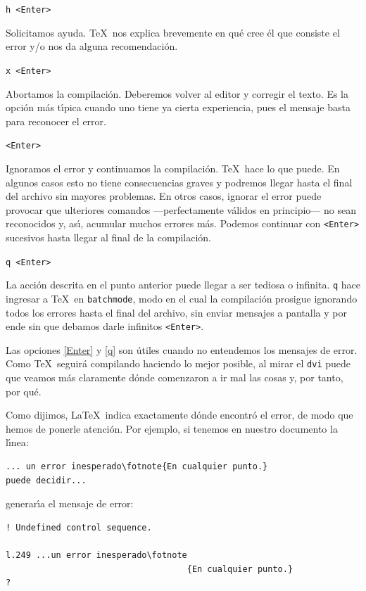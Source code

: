 \begin{list}{()}{%
\renewcommand{\theenumi}{(\alph{enumi})}}
\item \verb+h <Enter>+

Solicitamos ayuda. \TeX\ nos explica brevemente en qu{\'e} cree {\'e}l
que consiste el error y/o nos da alguna recomendaci{\'o}n.

\item \verb+x <Enter>+

Abortamos la compilaci{\'o}n. Deberemos volver al editor y corregir el
texto. Es la opci{\'o}n m{\'a}s t\'{\i}pica cuando uno tiene ya cierta
experiencia, pues el mensaje basta para reconocer el error.

\item \verb+<Enter>+
\label{Enter}

Ignoramos el error y continuamos la compilaci{\'o}n. \TeX\ hace lo que
puede. En algunos casos esto no tiene consecuencias
graves y podremos llegar hasta el final del archivo sin mayores
problemas. En otros casos, ignorar el error puede provocar que
ulteriores comandos ---perfectamente v{\'a}lidos en principio--- no
sean reconocidos y, as\'{\i}, acumular muchos errores m{\'a}s. Podemos
continuar con \verb+<Enter>+ sucesivos hasta llegar al final de la
compilaci{\'o}n. 

\item \verb+q <Enter>+
\label{q}

La acci{\'o}n descrita en el punto anterior puede llegar a ser tediosa o
infinita. \verb+q+ hace ingresar a \TeX\ en \verb+batchmode+, modo en
el cual la compilaci{\'o}n prosigue ignorando todos los errores hasta
el final del archivo, sin enviar mensajes a pantalla y por ende sin
que debamos darle infinitos \verb+<Enter>+. 

\end{list}

Las opciones \ref{Enter} y \ref{q} son
{\'u}tiles cuando no entendemos los mensajes de error. Como \TeX\ seguir{\'a}
compilando haciendo lo mejor posible, al mirar el \verb+dvi+ puede
que veamos m{\'a}s claramente d{\'o}nde comenzaron a ir mal las cosas y,
por tanto, por qu{\'e}.

\vspace{.3cm}
Como dijimos, \LaTeX\ indica exactamente d{\'o}nde encontr{\'o} el error,
de modo que hemos de ponerle atenci{\'o}n. Por ejemplo, si 
tenemos en nuestro documento la l\'{\i}nea:
\begin{verbatim}
... un error inesperado\fotnote{En cualquier punto.} 
puede decidir...
\end{verbatim}
generar\'{\i}a el mensaje de error:
\begin{verbatim}
! Undefined control sequence.

l.249 ...un error inesperado\fotnote
                                    {En cualquier punto.}
?
\end{verbatim}


